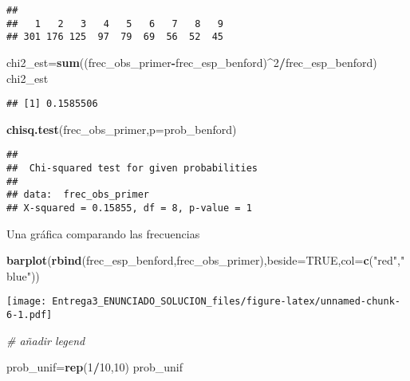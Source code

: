 \documentclass[
]{article}
\newenvironment{Shaded}{\begin{snugshade}}{\end{snugshade}}
\newcommand{\CommentTok}[1]{\textcolor[rgb]{0.56,0.35,0.01}{\textit{#1}}}
\newcommand{\DataTypeTok}[1]{\textcolor[rgb]{0.13,0.29,0.53}{#1}}
\newcommand{\DecValTok}[1]{\textcolor[rgb]{0.00,0.00,0.81}{#1}}
\newcommand{\KeywordTok}[1]{\textcolor[rgb]{0.13,0.29,0.53}{\textbf{#1}}}
\newcommand{\NormalTok}[1]{#1}
\newcommand{\OperatorTok}[1]{\textcolor[rgb]{0.81,0.36,0.00}{\textbf{#1}}}
\newcommand{\OtherTok}[1]{\textcolor[rgb]{0.56,0.35,0.01}{#1}}
\newcommand{\StringTok}[1]{\textcolor[rgb]{0.31,0.60,0.02}{#1}}
\begin{document}
\begin{verbatim}
## 
##   1   2   3   4   5   6   7   8   9 
## 301 176 125  97  79  69  56  52  45
\end{verbatim}

\begin{Shaded}
\begin{Highlighting}[]
\NormalTok{chi2_est=}\KeywordTok{sum}\NormalTok{((frec_obs_primer}\OperatorTok{-}\NormalTok{frec_esp_benford)}\OperatorTok{^}\DecValTok{2}\OperatorTok{/}\NormalTok{frec_esp_benford)}
\NormalTok{chi2_est}
\end{Highlighting}
\end{Shaded}

\begin{verbatim}
## [1] 0.1585506
\end{verbatim}

\begin{Shaded}
\begin{Highlighting}[]
\KeywordTok{chisq.test}\NormalTok{(frec_obs_primer,}\DataTypeTok{p=}\NormalTok{prob_benford)}
\end{Highlighting}
\end{Shaded}

\begin{verbatim}
## 
##  Chi-squared test for given probabilities
## 
## data:  frec_obs_primer
## X-squared = 0.15855, df = 8, p-value = 1
\end{verbatim}

Una gráfica comparando las frecuencias

\begin{Shaded}
\begin{Highlighting}[]
\KeywordTok{barplot}\NormalTok{(}\KeywordTok{rbind}\NormalTok{(frec_esp_benford,frec_obs_primer),}\DataTypeTok{beside=}\OtherTok{TRUE}\NormalTok{,}\DataTypeTok{col=}\KeywordTok{c}\NormalTok{(}\StringTok{"red"}\NormalTok{,}\StringTok{"blue"}\NormalTok{))}
\end{Highlighting}
\end{Shaded}

\texttt{[image: Entrega3\_ENUNCIADO\_SOLUCION\_files/figure-latex/unnamed-chunk-6-1.pdf]}

\begin{Shaded}
\begin{Highlighting}[]
\CommentTok{# añadir legend}
\end{Highlighting}
\end{Shaded}

\begin{Shaded}
\begin{Highlighting}[]
\NormalTok{prob_unif=}\KeywordTok{rep}\NormalTok{(}\DecValTok{1}\OperatorTok{/}\DecValTok{10}\NormalTok{,}\DecValTok{10}\NormalTok{)}
\NormalTok{prob_unif}
\end{Highlighting}
\end{Shaded}
\end{document}

